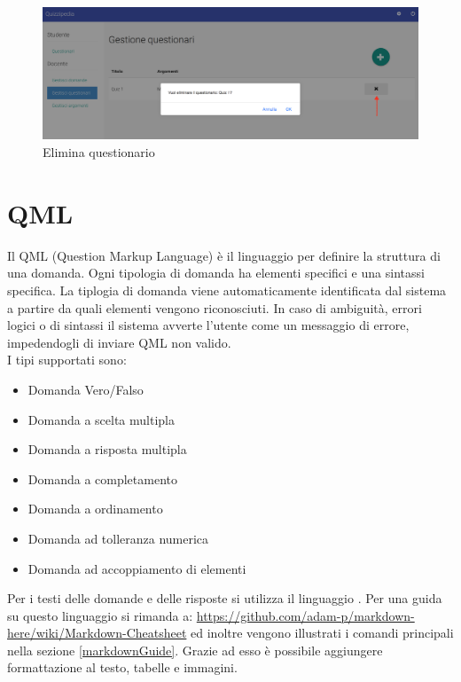\documentclass[12pt,a4paper]{article}
\begin{document}
		\begin{figure}[H]	
			\centering
			\includegraphics[width=\linewidth]{../img/screenshot/eliminaQuestionario.png}
			\caption{Elimina questionario}
			\label{Elimina questionario}
		\end{figure}
		

	
	\section{QML}
	\par Il QML (Question Markup Language) è il linguaggio per definire la struttura di una domanda. Ogni tipologia di domanda ha elementi specifici e una sintassi specifica. La tiplogia di domanda viene automaticamente identificata dal sistema a partire da quali elementi vengono riconosciuti. In caso di ambiguità, errori logici o di sintassi il sistema avverte l'utente come un messaggio di errore, impedendogli di inviare QML non valido. \\
		
	 I tipi supportati sono:
	\begin{itemize}
		\item Domanda Vero/Falso
		\item Domanda a scelta multipla
		\item Domanda a risposta multipla
		\item Domanda a completamento
		\item Domanda a ordinamento
		\item Domanda ad tolleranza numerica
		\item Domanda ad accoppiamento di elementi
	\end{itemize}
	Per i testi delle domande e delle risposte si utilizza il linguaggio . Per una guida su questo linguaggio si rimanda a: \url{https://github.com/adam-p/markdown-here/wiki/Markdown-Cheatsheet} ed inoltre vengono illustrati i comandi principali nella sezione \ref{markdownGuide}. Grazie ad esso è possibile aggiungere formattazione al testo, tabelle e immagini.
	 
\end{document}
